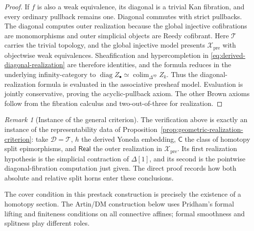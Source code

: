 \documentclass[12pt]{amsart}
\theoremstyle{definition}
\theoremstyle{remark}
\newtheorem{rem}[thm]{Remark}
\numberwithin{equation}{section}
\newcommand{\op}{\mathrm{op}}
\begin{document}
\begin{proof}
If $f$ is also a weak equivalence, its diagonal is a trivial Kan
fibration, and every ordinary pullback remains one. Diagonal
commutes with strict pullbacks. The diagonal computes outer
realization because the global injective cofibrations are
monomorphisms and outer simplicial objects are Reedy cofibrant.
Here $\mathcal T$ carries the trivial topology, and the global
injective model presents $\mathcal X_{\mathrm{pre}}$ with
objectwise weak equivalences. Sheafification and hypercompletion
in \eqref{eq:derived-diagonal-realization} are therefore identities,
and the formula reduces in the underlying infinity-category to
$\operatorname{diag}Z_\bullet\simeq
\operatorname*{colim}_{\Delta^{\op}}Z_k$. Thus the
diagonal-realization formula is evaluated in the associative
presheaf model. Evaluation is jointly conservative, proving the
acyclic-pullback axiom. The other Brown axioms follow from the
fibration calculus and two-out-of-three for
realization.
\end{proof}

\begin{rem}[Instance of the general criterion]
\label{rem:nc-split-criterion-instance}
The verification above is exactly an instance of the
representability data of
Proposition~\ref{prop:geometric-realization-criterion}: take
$\mathcal D=\mathcal T$, $h$ the derived Yoneda embedding,
$\mathsf C$ the class of homotopy split epimorphisms, and
$\mathsf{Real}$ the outer realization in
$\mathcal X_{\mathrm{pre}}$. Its first realization hypothesis is
the simplicial contraction of $\Delta[1]$, and its second is the
pointwise diagonal-fibration computation just given. The direct
proof records how both absolute and relative split horns enter
these conclusions.
\end{rem}

The cover condition in this prestack construction is precisely
the existence of a homotopy section. The Artin/DM construction below uses Pridham's formal
lifting and finiteness conditions on all connective
affines; formal smoothness and splitness play different roles.
\end{document}
